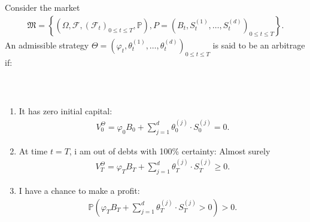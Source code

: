 \documentclass{beamer}
\numberwithin{equation}{section}
\begin{document}
\begin{frame}\frametitle{{\normalsize \secname} \\ {\large \subsecname}}
    \begin{definition}[Arbitrage]
        Consider the market
        \begin{align}
            \mathfrak{M} =
            \left\{
                \left(
                    \Omega,
                    \mathscr{F},
                    \left(
                        \mathscr{F}_t
                    \right)_{0 \leq t \leq T},
                    \mathbb{P}
                \right),
                P =
                \left(
                    B_t,
                    S_t^{(1)},
                    \ldots,
                    S_t^{(d)}
                \right)_{0 \leq t \leq T}
            \right\}.
        \end{align}
        An admissible strategy $\Theta = \left(\varphi_t, \theta_t^{(1)}, \ldots, \theta_t^{(d)}\right)_{0 \leq t \leq T}$ is said to be an arbitrage if:
    \end{definition}
\end{frame}

\begin{frame}\frametitle{{\normalsize \secname} \\ {\large \subsecname}}
    \begingroup
    \small
    \begin{enumerate}
        \item It has zero initial capital:
        \begin{align}
            V_0^\Theta = \varphi_0B_0 + \sum_{j = 1}^d\theta_0^{(j)} \cdot S_0^{(j)} = 0.
        \end{align}
        \item At time $t = T$, i am out of debts with 100\% certainty: Almost surely
        \begin{align}
            V_T^\Theta = \varphi_T B_T + \sum_{j = 1}^d\theta_T^{(j)} \cdot S_T^{(j)} \geq 0.
        \end{align}
        \item I have a chance to make a profit:
        \begin{align}
            \mathbb{P}
            \left(
                \varphi_TB_T + \sum_{j = 1}^d \theta_T^{(j)} \cdot S_T^{(j)} > 0
            \right) > 0.
        \end{align}
    \end{enumerate}
    \endgroup
\end{frame}
\end{document}
